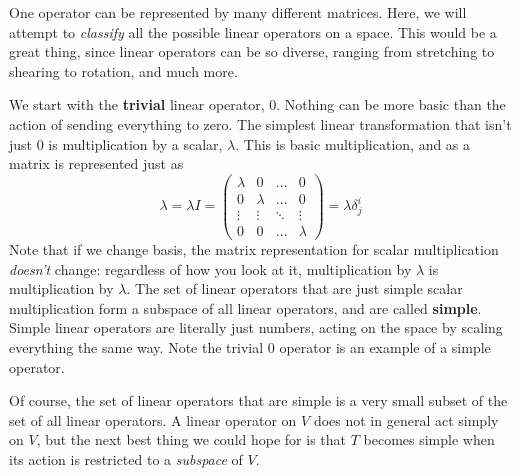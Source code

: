 	One operator can be represented by many different matrices. Here, we will attempt to \emph{classify} all the possible linear operators on a space. This would be a great thing, since linear operators can be so diverse, ranging from stretching to shearing to rotation, and much more. 
	
	We start with the \textbf{trivial} linear operator, $0$. Nothing can be more basic than the action of sending everything to zero. The simplest linear transformation that isn't just $0$ is multiplication by a scalar, $\lambda$. This is basic multiplication, and as a matrix is represented just as
	\begin{equation*}
		\lambda = \lambda I=
		\begin{pmatrix}
			\lambda & 0 & \dots & 0 \\
			0 & \lambda & \dots & 0 \\
			\vdots & \vdots & \ddots & \vdots \\
			0 & 0 & \dots & \lambda
		\end{pmatrix}  = \lambda \delta^i_j
	\end{equation*}
	Note that if we change basis, the matrix representation for scalar multiplication \emph{doesn't} change: regardless of how you look at it, multiplication by $\lambda$ is multiplication by $\lambda$. The set of linear operators that are just simple scalar multiplication form a subspace of all linear operators, and are called \textbf{simple}. Simple linear operators are literally just numbers, acting on the space by scaling everything the same way. Note the trivial $0$ operator is an example of a simple operator.
	
	Of course, the set of linear operators that are simple is a very small subset of the set of all linear operators. A linear operator on $V$ does not in general act simply on $V$, but the next best thing we could hope for is that $T$ becomes simple when its action is restricted to a \emph{subspace} of $V$. 
	
	
%
	
